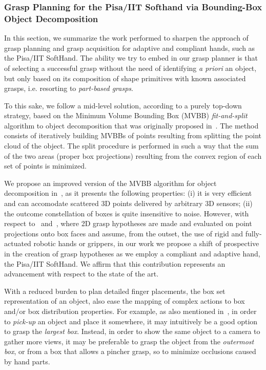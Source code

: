 
\subsubsection{Grasp Planning for the Pisa/IIT Softhand via Bounding-Box Object Decomposition}
\label{sec:GraspPlanningBoundingBoxes}

In this section, we summarize the work performed to sharpen the approach of grasp planning and grasp acquisition for adaptive and compliant hands, such as the Pisa/IIT SoftHand. The ability we try to embed in our grasp planner is that of selecting a successful grasp without the need of identifying \emph{a priori} an object, but only based on its composition of shape primitives with known associated grasps, i.e. resorting to \emph{part-based grasps}.

To this sake, we follow a mid-level solution, according to a purely top-down strategy, based on the Minimum Volume Bounding Box (MVBB) \emph{fit-and-split} algorithm to object decomposition that was originally proposed in~\cite{Huebner:ICRA:2008}. The method consists of iteratively building MVBBs of points resulting from splitting the point cloud of the object. The split procedure is performed in such a way that the sum of the two areas (proper box projections) resulting from the convex region of each set of points is minimized.

We propose an improved version of the MVBB algorithm for object decomposition in~\cite{Huebner:ICRA:2008}, as it presents the following properties: (i) it is very efficient and can accomodate scattered 3D points delivered by arbitrary 3D sensors; (ii) the outcome constellation of boxes is quite insensitive to noise. However, with respect to~\cite{Huebner:IROS:2008} and~\cite{Geidenstam:RSS:2009}, where 2D grasp hypotheses are made and evaluated on point projections onto box faces and assume, from the outset, the use of rigid and fully-actuated robotic hands or grippers, in our work we propose a shift of prospective in the creation of grasp hypotheses as we employ a compliant and adaptive hand, the Pisa/IIT SoftHand. We affirm that this contribution represents an advancement with respect to the state of the art.

With a reduced burden to plan detailed finger placements, the box set representation of an object, also ease the mapping of complex actions to box and/or box distribution properties. For example, as also mentioned in~\cite{Huebner:IROS:2008}, in order to \emph{pick-up} an object and place it somewhere, it may intuitively be a good option to grasp the \emph{largest box}. Instead, in order to show the same object to a camera to gather more views, it may be preferable to grasp the object from the \emph{outermost box}, or from a box that allows a pincher grasp, so to minimize occlusions caused by hand parts.

